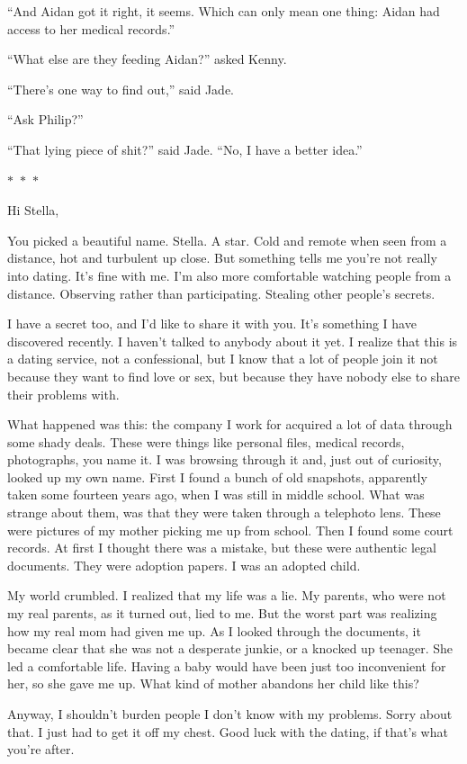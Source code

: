 \documentclass{memoir}
\newcommand{\starbreak}{%
\begin{center}
  $\ast$~$\ast$~$\ast$
\end{center}
}
\begin{document}
``And Aidan got it right, it seems. Which can only mean one thing: Aidan had access to her medical records.'' 

``What else are they feeding Aidan?'' asked Kenny.

``There's one way to find out,'' said Jade.

``Ask Philip?''

``That lying piece of shit?''  said Jade. ``No, I have a better idea.''

\starbreak

Hi Stella,

You picked a beautiful name. Stella. A star. Cold and remote when seen from a distance, hot and turbulent up close. But something tells me you're not really into dating. It's fine with me. I'm also more comfortable watching people from a distance. Observing rather than participating. Stealing other people's secrets.

I have a secret too, and I'd like to share it with you. It's something I have discovered recently. I haven't talked to anybody about it yet. I realize that this is a dating service, not a confessional, but I know that a lot of people join it not because they want to find love or sex, but because they have nobody else to share their problems with. 

What happened was this: the company I work for acquired a lot of data through some shady deals. These were things like personal files, medical records, photographs, you name it. I was browsing through it and, just out of curiosity, looked up my own name. First I found a bunch of old snapshots, apparently taken some fourteen years ago, when I was still in middle school. What was strange about them, was that they were taken through a telephoto lens. These were pictures of my mother picking me up from school. Then I found some court records. At first I thought there was a mistake, but these were authentic legal documents. They were adoption papers. I was an adopted child. 

My world crumbled. I realized that my life was a lie. My parents, who were not my real parents, as it turned out, lied to me. But the worst part was realizing how my real mom had given me up. As I looked through the documents, it became clear that she was not a desperate junkie, or a knocked up teenager. She led a comfortable life. Having a baby would have been just too inconvenient for her, so she gave me up. What kind of mother abandons her child like this? 

Anyway, I shouldn't burden people I don't know with my problems. Sorry about that. I just had to get it off my chest. Good luck with the dating, if that's what you're after.
\end{document}
